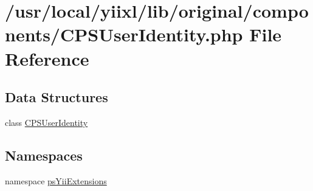 \hypertarget{CPSUserIdentity_8php}{
\section{/usr/local/yiixl/lib/original/components/CPSUserIdentity.php File Reference}
\label{CPSUserIdentity_8php}
}
\subsection*{Data Structures}
\begin{DoxyCompactItemize}
\item 
class \hyperlink{classCPSUserIdentity}{CPSUserIdentity}
\end{DoxyCompactItemize}
\subsection*{Namespaces}
\begin{DoxyCompactItemize}
\item 
namespace \hyperlink{namespacepsYiiExtensions}{psYiiExtensions}
\end{DoxyCompactItemize}
